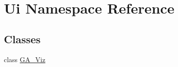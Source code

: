 \hypertarget{namespace_ui}{}\section{Ui Namespace Reference}
\label{namespace_ui}
\subsection*{Classes}
\begin{DoxyCompactItemize}
\item 
class \hyperlink{class_ui_1_1_g_a___viz}{G\+A\+\_\+\+Viz}
\end{DoxyCompactItemize}
